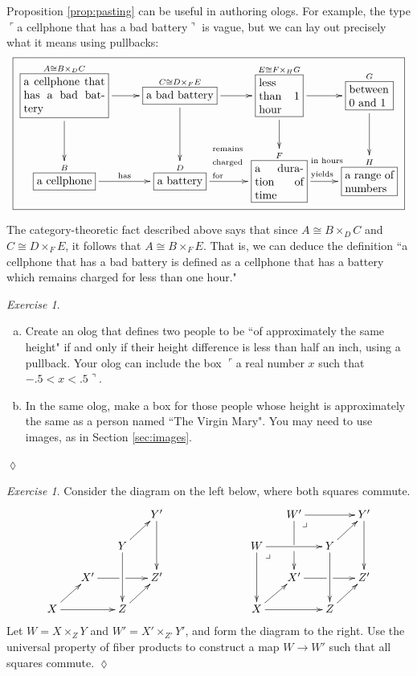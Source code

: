 \documentclass{book}
\makeatletter
\def\tn{\textnormal}
\def\to{\rightarrow}
\def\iso{\cong}
\def\rr{\raggedright}
\newcommand{\LA}[2]{\ar[#1]^-{\tn {#2}}}
\newcommand{\obox}[3]{\stackrel{#1}{\fbox{\parbox{#2}{#3}}}}
\newcommand{\smbox}[2]{\stackrel{#1}{\fbox{#2}}}
\newcommand{\fakebox}[1]{\tn{$\ulcorner$#1$\urcorner$}}
\def\ullimit{\ar@{}[rd]|(.3)*+{\lrcorner}}
\theoremstyle{remark}
\newtheorem{exc}[subsubsection]{Exercise}
\newenvironment{exercise}{\begin{exc}}{\hspace*{\fill}$\lozenge$\end{exc}}
\theoremstyle{definition}
\def\sexc{\begin{enumerate}[a.)]\setlength{\itemsep}{.1cm}\setlength{\parskip}{.1cm}\item}
\def\next{\item}
\def\endsexc{\end{enumerate}}
\makeatother
\begin{document}
Proposition \ref{prop:pasting} can be useful in authoring ologs. For example, the type \fakebox{a cellphone that has a bad battery} is vague, but we can lay out precisely what it means using pullbacks:
\small
\begin{align}\label{dia:bad battery}
\fbox{\xymatrixnocompile{\obox{A\iso B\times_DC}{1in}{a cellphone that has a bad battery}\ar[r]\ar[d]&\smbox{C\iso D\times_FE}{a bad battery}\ar[r]\ar[d]&\obox{E\iso F\times_HG}{.5in}{less than 1 hour}\ar[r]\ar[d]&\obox{G}{.5in}{between 0 and 1}\ar[d]\\\smbox{B}{a cellphone}\LA{r}{has}&\smbox{D}{a battery}\LA{r}{\parbox{.4in}{\rr remains charged for}}&\obox{F}{.6in}{a duration of time}\LA{r}{\hspace{.07in}\parbox{.4in}{\rr in hours yields}}&\obox{H}{.6in}{a range of numbers}}}
\end{align}\normalsize

The category-theoretic fact described above says that since $A\iso B\times_DC$ and $C\iso D\times_FE$, it follows that $A\iso B\times_FE$.  That is, we can deduce the definition ``a cellphone that has a bad battery is defined as a cellphone that has a battery which remains charged for less than one hour."  

\begin{exercise}~
\sexc Create an olog that defines two people to be ``of approximately the same height" if and only if their height difference is less than half an inch, using a pullback. Your olog can include the box \fakebox{a real number $x$ such that $-.5<x<.5$}. 
\next In the same olog, make a box for those people whose height is approximately the same as a person named ``The Virgin Mary". You may need to use images, as in Section \ref{sec:images}.
\endsexc
\end{exercise}

\begin{exercise}\label{exc:pointwise map of fp}
Consider the diagram on the left below, where both squares commute. 
$$
\xymatrix@=15pt{
&&&Y'\ar[dd]\\
&&Y\ar[ru]\ar[dd]\\
&X'\ar'[r][rr]&&Z'\\
X\ar[rr]\ar[ru]&&Z\ar[ru]
}
\hspace{1in}
\xymatrix@=15pt{
&W'\ar[rr]\ar'[d][dd]\ullimit&&Y'\ar[dd]\\
W\ar[rr]\ar[dd]\ullimit&&Y\ar[ru]\ar[dd]\\
&X'\ar'[r][rr]&&Z'\\
X\ar[rr]\ar[ru]&&Z\ar[ru]
}
$$
Let $W=X\times_ZY$ and $W'=X'\times_{Z'}Y'$, and form the diagram to the right. Use the universal property of fiber products to construct a map $W\to W'$ such that all squares commute.
\end{exercise}
\end{document}
